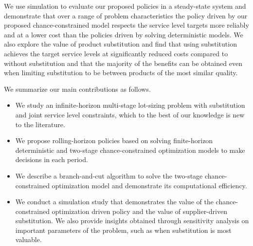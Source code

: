 \documentclass[msom]{oo}
\begin{document}
We use simulation to evaluate our proposed policies in a steady-state system and demonstrate that over a range of problem characteristics the policy driven by our proposed chance-constrained model respects the service level targets more reliably and at a lower cost than the policies driven by solving deterministic models. We also explore the value of product substitution and find that using substitution achieves the target service levels at significantly reduced costs compared to without substitution and that the majority of the benefits can be obtained even when limiting substitution to be between products of the most similar quality.

We summarize our main contributions as follows. 
\begin{itemize}
\item We study an infinite-horizon multi-stage lot-sizing problem with substitution and joint service level constraints, which to the best of our knowledge is new to the literature.

\item We propose rolling-horizon policies based on solving finite-horizon deterministic and two-stage chance-constrained optimization models to make decisions in each period.

\item We describe a branch-and-cut algorithm to solve the two-stage chance-constrained optimization model and demonstrate its computational efficiency.

\item We conduct a simulation study that demonstrates the value of the chance-constrained optimization driven policy and the value of supplier-driven substitution. We also provide insights obtained through sensitivity analysis on important parameters of the problem, such as when substitution is most valuable. %
    


\end{itemize}
\end{document}
